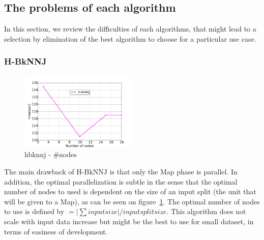  
 
\subsection{The problems of each algorithm}
In this section, we review the difficulties of each algorithms, that might lead to a selection by elimination of the best algorithm to choose for a particular use case.
\subsubsection{H-BkNNJ}
\begin{figure}[!h]
\centering
                \includegraphics[width=0.5\textwidth]{img-perf/perso/hbknnj/nodes.pdf}
 \caption{hbknnj - \#nodes}
 \label{hbknnj_exp}
\end{figure}
The main drawback of H-BkNNJ is that only the Map phase is parallel. In addition, the optimal parallelization is subtle in the sense that the optimal number of nodes to used is dependent on the size of an input split (the unit that will be given to a Map), as can be seen on figure~\ref{hbknnj_exp}. The optimal number of nodes to use is defined by  $=|\sum input size|/input split  size$. This algorithm does not scale with input data increase but might be the best to use for small dataset, in terms of easiness of development.

